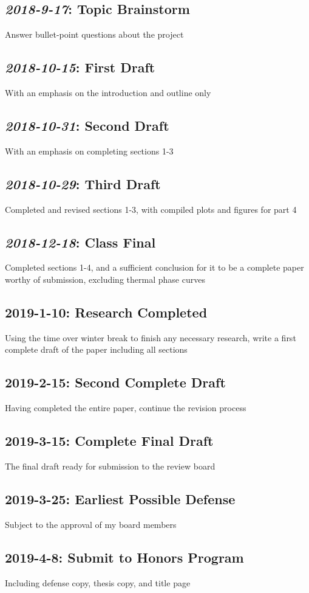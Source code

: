\documentclass[11pt]{article}
\begin{document}
\subsection*{{\it 2018-9-17}: Topic Brainstorm} Answer bullet-point questions about the project
\subsection*{{\it 2018-10-15}: First Draft} With an emphasis on the introduction and outline only
\subsection*{{\it 2018-10-31}: Second Draft} With an emphasis on completing sections 1-3
\subsection*{{\it 2018-10-29}: Third Draft} Completed and revised sections 1-3, with compiled plots and figures for part 4
\subsection*{{\it 2018-12-18}: Class Final} Completed sections 1-4, and a sufficient conclusion for it to be a complete paper worthy of submission, excluding thermal phase curves
\subsection*{2019-1-10: Research Completed} Using the time over winter break to finish any necessary research, write a first complete draft of the paper including all sections
\subsection*{2019-2-15: Second Complete Draft} Having completed the entire paper, continue the revision process
\subsection*{2019-3-15: Complete Final Draft} The final draft ready for submission to the review board
\subsection*{2019-3-25: Earliest Possible Defense} Subject to the approval of my board members
\subsection*{2019-4-8: Submit to Honors Program} Including defense copy, thesis copy, and title page


\nocite{*}
\end{document}
